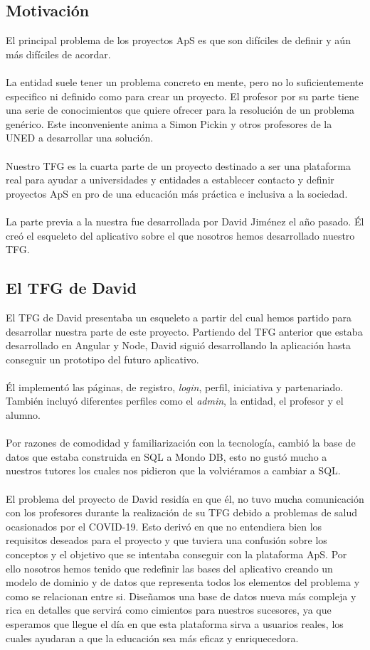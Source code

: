 \documentclass[11pt]{article}
\begin{document}
\subsection{Motivación}
El principal problema de los proyectos ApS es que son difíciles de definir y aún más difíciles de acordar.\\\\
La entidad suele tener un problema concreto en mente, pero no lo suficientemente especifico ni definido como para crear un proyecto. El profesor por su parte tiene una serie de conocimientos que quiere ofrecer para la resolución de un problema genérico.
Este inconveniente anima a Simon Pickin y otros profesores de la UNED a desarrollar una solución. \\\\
Nuestro TFG es la cuarta parte de un proyecto destinado a ser una plataforma real para ayudar a universidades y entidades a establecer contacto y definir proyectos ApS en pro de una educación más práctica e inclusiva a la sociedad.\\\\
La parte previa a la nuestra fue desarrollada por David Jiménez el año pasado. Él creó el esqueleto del aplicativo sobre el que nosotros hemos desarrollado nuestro TFG.

\subsection{El TFG de David}
El TFG de David presentaba un esqueleto a partir del cual hemos partido para desarrollar nuestra parte de este proyecto. Partiendo del TFG anterior que estaba desarrollado en Angular y Node, David siguió desarrollando la aplicación hasta conseguir un prototipo del futuro aplicativo.\\\\
Él implementó las páginas, de registro, \textit{login}, perfil, iniciativa y partenariado. También incluyó diferentes perfiles como el \textit{admin}, la entidad, el profesor y el alumno.\\\\
Por razones de comodidad y familiarización con la tecnología, cambió la base de datos que estaba construida en SQL a Mondo DB, esto no gustó mucho a nuestros tutores los cuales nos pidieron que la volviéramos a  cambiar a SQL.\\\\
El problema del proyecto de David residía en que él, no tuvo mucha comunicación con los profesores durante la realización de su TFG debido a problemas de salud ocasionados por el COVID-19. Esto derivó en que no entendiera bien los requisitos deseados para el proyecto y que tuviera una confusión sobre los conceptos y el objetivo que se intentaba conseguir con la plataforma ApS. Por ello nosotros hemos tenido que redefinir las bases del aplicativo creando un modelo de dominio y de datos que representa todos los elementos del problema y como se relacionan entre si. Diseñamos una base de datos nueva más compleja y rica en detalles que servirá como cimientos para nuestros sucesores, ya que esperamos que llegue el día en que esta plataforma sirva a usuarios reales, los cuales ayudaran a que la educación sea más eficaz y enriquecedora.
\end{document}
